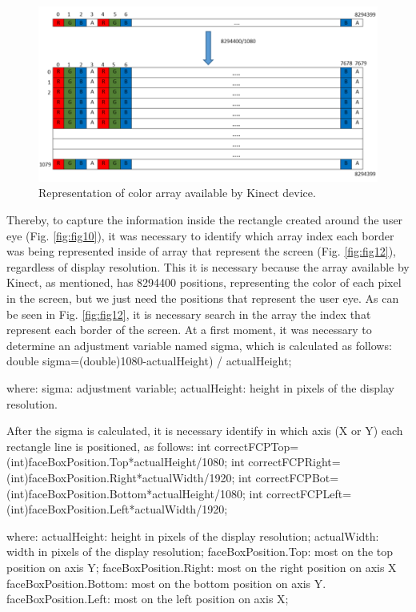 \documentclass[10pt, conference]{IEEEtran}
\begin{document}
  \begin{figure}[t]
      \centering
      \includegraphics{figures/pic11.png}
      \caption{Representation of color array available by Kinect device.}
      \label{fig:fig11}
  \end{figure}

	Thereby, to capture the information inside the rectangle created around the user eye (Fig. \ref{fig:fig10}), it was necessary to identify which array index each border was being represented inside of array that represent the screen (Fig. \ref{fig:fig12}), regardless of display resolution. 
	This it is necessary because the array available by Kinect, as mentioned, has 8294400 positions, representing the color of each pixel in the screen, but we just need the positions that represent the user eye. 
	As can be seen in Fig. \ref{fig:fig12}, it is necessary search in the array the index that represent each border of the screen. 
	At a first moment, it was necessary to determine an adjustment variable named sigma, which is calculated as follows:
double sigma=(double)1080-actualHeight) / actualHeight;

where:
	sigma: adjustment variable;
	actualHeight: height in pixels of the display resolution.

After the sigma is calculated, it is necessary identify in which axis (X or Y) each rectangle line is positioned, as follows:
int correctFCPTop=(int)faceBoxPosition.Top*actualHeight/1080;
int correctFCPRight=(int)faceBoxPosition.Right*actualWidth/1920;
int correctFCPBot=(int)faceBoxPosition.Bottom*actualHeight/1080;
int correctFCPLeft=(int)faceBoxPosition.Left*actualWidth/1920;

where:
	actualHeight: height in pixels of the display resolution;
	actualWidth: width in pixels of the display resolution;
	faceBoxPosition.Top: most on the top position on axis Y;
	faceBoxPosition.Right: most on the right position on axis X
	faceBoxPosition.Bottom: most on the bottom position on axis Y.
	faceBoxPosition.Left: most on the left position on axis X;
\end{document}
